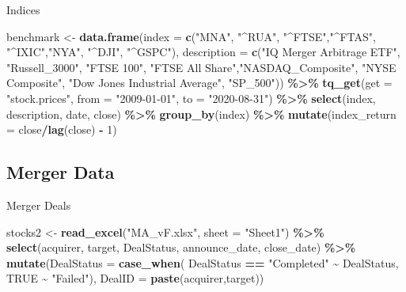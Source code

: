 \documentclass[
]{article}
\newenvironment{Shaded}{\begin{snugshade}}{\end{snugshade}}
\newcommand{\DataTypeTok}[1]{\textcolor[rgb]{0.13,0.29,0.53}{#1}}
\newcommand{\DecValTok}[1]{\textcolor[rgb]{0.00,0.00,0.81}{#1}}
\newcommand{\KeywordTok}[1]{\textcolor[rgb]{0.13,0.29,0.53}{\textbf{#1}}}
\newcommand{\NormalTok}[1]{#1}
\newcommand{\OperatorTok}[1]{\textcolor[rgb]{0.81,0.36,0.00}{\textbf{#1}}}
\newcommand{\OtherTok}[1]{\textcolor[rgb]{0.56,0.35,0.01}{#1}}
\newcommand{\StringTok}[1]{\textcolor[rgb]{0.31,0.60,0.02}{#1}}
\begin{document}
Indices

\begin{Shaded}
\begin{Highlighting}[]
\NormalTok{benchmark \textless{}{-}}\StringTok{ }
\StringTok{  }\KeywordTok{data.frame}\NormalTok{(}\DataTypeTok{index =} \KeywordTok{c}\NormalTok{(}\StringTok{"MNA"}\NormalTok{, }\StringTok{"\^{}RUA"}\NormalTok{, }\StringTok{"\^{}FTSE"}\NormalTok{,}\StringTok{"\^{}FTAS"}\NormalTok{, }\StringTok{"\^{}IXIC"}\NormalTok{,}\StringTok{"NYA"}\NormalTok{, }\StringTok{"\^{}DJI"}\NormalTok{, }\StringTok{"\^{}GSPC"}\NormalTok{),}
             \DataTypeTok{description =} \KeywordTok{c}\NormalTok{(}\StringTok{"IQ Merger Arbitrage ETF"}\NormalTok{, }\StringTok{"Russell\_3000"}\NormalTok{, }\StringTok{"FTSE 100"}\NormalTok{, }\StringTok{"FTSE All Share"}\NormalTok{,}\StringTok{"NASDAQ\_Composite"}\NormalTok{, }\StringTok{"NYSE Composite"}\NormalTok{, }\StringTok{"Dow Jones Industrial Average"}\NormalTok{, }\StringTok{"SP\_500"}\NormalTok{)) }\OperatorTok{\%\textgreater{}\%}\StringTok{ }
\StringTok{  }\KeywordTok{tq\_get}\NormalTok{(}\DataTypeTok{get  =} \StringTok{"stock.prices"}\NormalTok{,}
         \DataTypeTok{from =} \StringTok{"2009{-}01{-}01"}\NormalTok{,}
         \DataTypeTok{to   =} \StringTok{"2020{-}08{-}31"}\NormalTok{) }\OperatorTok{\%\textgreater{}\%}
\StringTok{  }\KeywordTok{select}\NormalTok{(index, description, date, close) }\OperatorTok{\%\textgreater{}\%}
\StringTok{  }\KeywordTok{group\_by}\NormalTok{(index) }\OperatorTok{\%\textgreater{}\%}
\StringTok{  }\KeywordTok{mutate}\NormalTok{(}\DataTypeTok{index\_return =}\NormalTok{ close}\OperatorTok{/}\KeywordTok{lag}\NormalTok{(close) }\OperatorTok{{-}}\StringTok{ }\DecValTok{1}\NormalTok{)}
\end{Highlighting}
\end{Shaded}

\hypertarget{merger-data}{%
\subsection{Merger Data}\label{merger-data}}

Merger Deals

\begin{Shaded}
\begin{Highlighting}[]
\NormalTok{stocks2 \textless{}{-}}\StringTok{ }\KeywordTok{read\_excel}\NormalTok{(}\StringTok{"MA\_vF.xlsx"}\NormalTok{, }\DataTypeTok{sheet =} \StringTok{"Sheet1"}\NormalTok{) }\OperatorTok{\%\textgreater{}\%}\StringTok{ }
\StringTok{  }\KeywordTok{select}\NormalTok{(acquirer, target, DealStatus, announce\_date, close\_date) }\OperatorTok{\%\textgreater{}\%}
\StringTok{  }\KeywordTok{mutate}\NormalTok{(}\DataTypeTok{DealStatus =} \KeywordTok{case\_when}\NormalTok{(}
\NormalTok{    DealStatus }\OperatorTok{==}\StringTok{ "Completed"} \OperatorTok{\textasciitilde{}}\StringTok{ }\NormalTok{DealStatus,}
    \OtherTok{TRUE} \OperatorTok{\textasciitilde{}}\StringTok{ "Failed"}\NormalTok{),}
    \DataTypeTok{DealID =} \KeywordTok{paste}\NormalTok{(acquirer,target))}
\end{Highlighting}
\end{Shaded}
\end{document}
